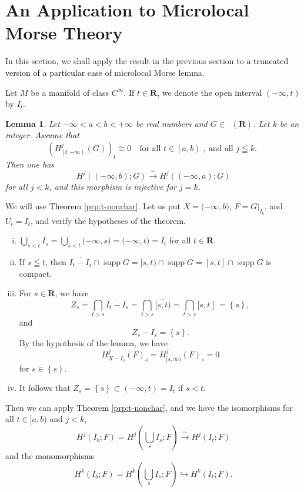 ﻿\documentclass[a4paper,leqno,dvipdfmx]{jsarticle}
\makeatletter
\newtheorem{Lemma+}[Axiom+]{Lemma}
\theoremstyle{definition}
\newcommand{\rr}{\mathbf{R}}
\renewenvironment{proof}[1][\proofname]{\par
  \pushQED{\qed}%
  \normalfont \topsep6\p@\@plus6\p@\relax
  \trivlist
  \item[\hskip\labelsep
         \bfseries
    {#1}]\ignorespaces
}{%
  \popQED\endtrivlist\@endpefalse
}
\renewcommand{\proofname}{Proof.}
\numberwithin{equation}{section}
\newcommand{\supp}{\mathop{\mathrm{supp}}\nolimits}
\newcommand{\Dompb}{\mathop{\mathsf{D}^\mathrm{b}}\nolimits}
\newcommand{\simar}{\mathrel{\overset{\sim}{\rightarrow}}}%
\newcommand{\simarr}{\mathrel{\overset{\sim}{\longrightarrow}}}%
\newcommand{\mres}[2][]{{\left.{#1}\right\rvert}_{#2}}
\theoremstyle{mystyle}
\newcommand{\lopen}{\mathopen{(}}
\newcommand{\lclosed}{\mathopen{[}}
\newcommand{\ropen}{\mathclose{)}}
\newcommand{\rclosed}{\mathopen{]}}
\newcommand{\smi}{-}
\makeatother
\begin{document}
\section{An Application to Microlocal Morse Theory}\label{sec:t-morse}

In this section, 
we shall apply the result in the previous section to 
\textcolor{black}{a truncated version of a particular case}
of microlocal Morse lemma. 

Let \(M\) be a manifold of class \(C^\infty\). 
If \(t\in\rr\), we denote the open interval \((-\infty,t)\) by \(I_{t}\). 

\begin{Lemma+}\label{Lem:1d-t-morse}
  Let \(-\infty<a<b<+\infty\) be real numbers 
  and \(G\in \Dompb(\rr)\). Let \(k\) be an integer.
  \textcolor{black}{Assume that} \[
      \left(
        H^{j}_{\left[t,+\infty\right)}(G)
      \right)_t
      \cong 0
      \quad
      \text{
          for all \(t\in\left[a,b\right)\) , 
          and all \(j\leqq k\).
      }
  \]
  Then one has \[
      H^{j}(\left(-\infty,b\right);G)\simarr
      H^{j}(\left(-\infty,a\right);G)
  \] for all \(j<k\), 
  and this morphism is injective for \(j=k\). 
\end{Lemma+}

\begin{proof}
  We will use \textcolor{black}{Theorem \ref{prp:t-nonchar}}. 
  Let us put \(X=\lopen-\infty,b\ropen\), 
  \(F=\mres[G]{I_{b}}\), and \(U_t=I_t\), 
  and verify the hypotheses of the \textcolor{black}{theorem}.  
  \begin{enumerate}[(i)]
    \item \(\bigcup_{s<t} I_s
    = \bigcup_{s<t}\lopen-\infty,s\ropen
    = \lopen-\infty,t\ropen= I_t\) for all \(t\in\rr\). 
    \item If \(s\leqq t\), then \(
      \overline{I_t\smi I_s}\cap\supp{G}
      =\overline{\lclosed s,t\ropen}\cap\supp{G}
      =[s,t]\cap\supp{G}
      \) is compact.
    \item For \(s\in\rr\), we have \[
      Z_{s}
      =\bigcap_{t>s}\overline{I_{t}\smi I_{s}}
      =\bigcap_{t>s}\overline{\lclosed s,t\ropen}
      =\bigcap_{t>s}\lclosed s,t\rclosed
      =\left\{s\right\},
    \]
    and \[
      Z_s\smi I_s
      =\left\{s\right\}. 
    \]
    By the hypothesis \textcolor{black}{of the lemma}, 
    we have 
    \[
      H^{j}_{X\smi I_s}(F)_{s}
      =H^{j}_{\lclosed s,\infty\ropen}(F)_{s}=0
    \]
    for \(s\in \left\{s\right\}\). 
    \item It follows that \(Z_{s}=\left\{s\right\} \subset (-\infty,t)=I_{t}\) if \(s<t\). 
  \end{enumerate}
  Then we can apply \textcolor{black}{Theorem \ref{prp:t-nonchar}}, and 
  we have the isomorphisms for all \(t\in \lclosed a,b\ropen\) and \(j<k\),
  \[
    H^{j}(I_{b};F)
    =H^{j}\left(\bigcup_{s}I_{s};F\right)
    \simar
    H^{j}(I_{t};F)
  \]
  and the \textcolor{black}{monomorphisms}
  \[
    H^{k}\left(I_{b};F\right)
    =H^{k}\left(\bigcup_{s}I_{s};F\right)
    \hookrightarrow
    H^{k}(I_{t};F).
  \]
\end{proof}
\end{document}
